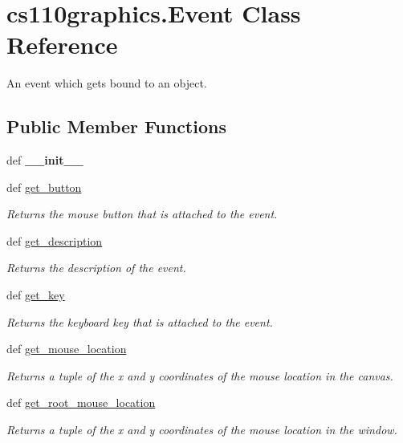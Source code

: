\hypertarget{classcs110graphics_1_1Event}{
\section{cs110graphics.Event Class Reference}
\label{classcs110graphics_1_1Event}
}


An event which gets bound to an object.  
\subsection*{Public Member Functions}
\begin{DoxyCompactItemize}
\item 
\hypertarget{classcs110graphics_1_1Event_a79559b269fdb9c2252dfce99118455be}{
def {\bfseries \_\-\_\-init\_\-\_\-}}
\label{classcs110graphics_1_1Event_a79559b269fdb9c2252dfce99118455be}

\item 
def \hyperlink{classcs110graphics_1_1Event_abdb7a2999936cc7ab1119289f05f8243}{get\_\-button}
\begin{DoxyCompactList}\small\item\em Returns the mouse button that is attached to the event. \item\end{DoxyCompactList}\item 
def \hyperlink{classcs110graphics_1_1Event_a7bd201ecbf74db6d78dbf2fb4f622a7c}{get\_\-description}
\begin{DoxyCompactList}\small\item\em Returns the description of the event. \item\end{DoxyCompactList}\item 
def \hyperlink{classcs110graphics_1_1Event_a0d795ddaef92049cee1d7b09898cf225}{get\_\-key}
\begin{DoxyCompactList}\small\item\em Returns the keyboard key that is attached to the event. \item\end{DoxyCompactList}\item 
def \hyperlink{classcs110graphics_1_1Event_a2db4866adee7a6ddb8d32240801fb8ce}{get\_\-mouse\_\-location}
\begin{DoxyCompactList}\small\item\em Returns a tuple of the x and y coordinates of the mouse location in the canvas. \item\end{DoxyCompactList}\item 
def \hyperlink{classcs110graphics_1_1Event_a7c8fb2d5e9288db125801d5a6e66ecf1}{get\_\-root\_\-mouse\_\-location}
\begin{DoxyCompactList}\small\item\em Returns a tuple of the x and y coordinates of the mouse location in the window. \item\end{DoxyCompactList}\end{DoxyCompactItemize}


